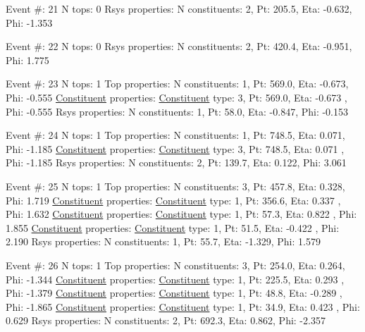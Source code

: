 \begin{DoxyCode}
Event #: 21
      N tops: 0
      Rsys properties: N constituents:   2,   Pt:  205.5,   Eta:  -0.632,   Phi:  -1.353

Event #: 22
      N tops: 0
      Rsys properties: N constituents:   2,   Pt:  420.4,   Eta:  -0.951,   Phi:   1.775

Event #: 23
      N tops: 1
      Top properties: N constituents:   1,   Pt:  569.0,   Eta:  -0.673,   Phi:  -0.555
          \hyperlink{classConstituent}{Constituent} properties: \hyperlink{classConstituent}{Constituent} type:   3,   Pt:  569.0,   Eta:  -0.673
      ,   Phi:  -0.555
      Rsys properties: N constituents:   1,   Pt:   58.0,   Eta:  -0.847,   Phi:  -0.153

Event #: 24
      N tops: 1
      Top properties: N constituents:   1,   Pt:  748.5,   Eta:   0.071,   Phi:  -1.185
          \hyperlink{classConstituent}{Constituent} properties: \hyperlink{classConstituent}{Constituent} type:   3,   Pt:  748.5,   Eta:   0.071
      ,   Phi:  -1.185
      Rsys properties: N constituents:   2,   Pt:  139.7,   Eta:   0.122,   Phi:   3.061

Event #: 25
      N tops: 1
      Top properties: N constituents:   3,   Pt:  457.8,   Eta:   0.328,   Phi:   1.719
          \hyperlink{classConstituent}{Constituent} properties: \hyperlink{classConstituent}{Constituent} type:   1,   Pt:  356.6,   Eta:   0.337
      ,   Phi:   1.632
          \hyperlink{classConstituent}{Constituent} properties: \hyperlink{classConstituent}{Constituent} type:   1,   Pt:   57.3,   Eta:   0.822
      ,   Phi:   1.855
          \hyperlink{classConstituent}{Constituent} properties: \hyperlink{classConstituent}{Constituent} type:   1,   Pt:   51.5,   Eta:  -0.422
      ,   Phi:   2.190
      Rsys properties: N constituents:   1,   Pt:   55.7,   Eta:  -1.329,   Phi:   1.579

Event #: 26
      N tops: 1
      Top properties: N constituents:   3,   Pt:  254.0,   Eta:   0.264,   Phi:  -1.344
          \hyperlink{classConstituent}{Constituent} properties: \hyperlink{classConstituent}{Constituent} type:   1,   Pt:  225.5,   Eta:   0.293
      ,   Phi:  -1.379
          \hyperlink{classConstituent}{Constituent} properties: \hyperlink{classConstituent}{Constituent} type:   1,   Pt:   48.8,   Eta:  -0.289
      ,   Phi:  -1.865
          \hyperlink{classConstituent}{Constituent} properties: \hyperlink{classConstituent}{Constituent} type:   1,   Pt:   34.9,   Eta:   0.423
      ,   Phi:   0.629
      Rsys properties: N constituents:   2,   Pt:  692.3,   Eta:   0.862,   Phi:  -2.357


\end{DoxyCode}
